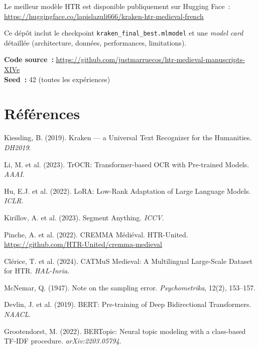 \documentclass[11pt,a4paper]{article}
\begin{document}
Le meilleur modèle HTR est disponible publiquement sur Hugging Face~:\\
\url{https://huggingface.co/lapislazuli666/kraken-htr-medieval-french}

\noindent Ce dépôt inclut le checkpoint \texttt{kraken\_final\_best.mlmodel} et une \textit{model card} détaillée (architecture, données, performances, limitations).

\vspace{0.5cm}
\noindent\textbf{Code source~:} \url{https://github.com/justmarruecos/htr-medieval-manuscripts-XIVe}\\
\textbf{Seed~:} 42 (toutes les expériences)

\section*{Références}

\begin{enumerate}[leftmargin=*, label={[\arabic*]}, itemsep=2pt, font=\small]
\item \label{kiessling2019} Kiessling, B. (2019). Kraken --- a Universal Text Recognizer for the Humanities. \textit{DH2019}.
\item \label{li2023} Li, M. et al. (2023). TrOCR: Transformer-based OCR with Pre-trained Models. \textit{AAAI}.
\item \label{hu2022} Hu, E.J. et al. (2022). LoRA: Low-Rank Adaptation of Large Language Models. \textit{ICLR}.
\item \label{kirillov2023} Kirillov, A. et al. (2023). Segment Anything. \textit{ICCV}.
\item Pinche, A. et al. (2022). CREMMA Médiéval. HTR-United. \url{https://github.com/HTR-United/cremma-medieval}
\item Clérice, T. et al. (2024). CATMuS Medieval: A Multilingual Large-Scale Dataset for HTR. \textit{HAL-Inria}.
\item McNemar, Q. (1947). Note on the sampling error. \textit{Psychometrika}, 12(2), 153--157.
\item Devlin, J. et al. (2019). BERT: Pre-training of Deep Bidirectional Transformers. \textit{NAACL}.
\item Grootendorst, M. (2022). BERTopic: Neural topic modeling with a class-based TF-IDF procedure. \textit{arXiv:2203.05794}.
\end{enumerate}
\end{document}
